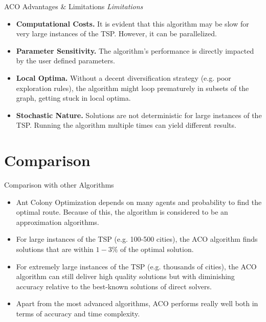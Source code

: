 \documentclass[aspectratio=169,xcolor=dvipsnames, t]{beamer}
\begin{document}
\begin{frame}{ACO Advantages \& Limitations}
	\vspace{-5mm}
	\onslide<2-> \textit{Limitations}
	\begin{itemize}
			\item<3-> \textbf{Computational Costs.} It is evident that this algorithm may be slow for very large instances of the TSP. However, it can be parallelized.
			\item<4-> \textbf{Parameter Sensitivity.} The algorithm's performance is directly impacted by the user defined parameters.
			\item<5-> \textbf{Local Optima.} Without a decent diversification strategy (e.g. poor exploration rules), the algorithm might loop prematurely in subsets of the graph, getting stuck in local optima.
			\item<6-> \textbf{Stochastic Nature.} Solutions are not deterministic for large instances of the TSP. Running the algorithm multiple times can yield different results.
	\end{itemize}
\end{frame}

\section{Comparison}
\begin{frame}{Comparison with other Algorithms}
	\vspace{-5mm}
	\begin{itemize}
		\item<2-> Ant Colony Optimization depends on many agents and probability to find the optimal route. Because of this, the algorithm is considered to be an approximation algorithms.
		\item<3-> For large instances of the TSP (e.g. 100-500 cities), the ACO algorithm finds solutions that are within \( 1 - 3\% \) of the optimal solution.
		\item<4-> For extremely large instances of the TSP (e.g. thousands of cities), the ACO algorithm can still deliver high quality solutions but with diminishing accuracy relative to the best-known solutions of direct solvers.
		\item<5-> Apart from the most advanced algorithms, ACO  performs really well both in terms of accuracy and time complexity. 
	\end{itemize}
\end{frame}
\end{document}
